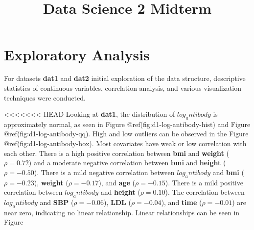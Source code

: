 \documentclass[
]{article}
\title{Data Science 2 Midterm}
\author{}
\date{\vspace{-2.5em}}
\begin{document}
\maketitle

\section{Exploratory Analysis}\label{exploratory-analysis}

For datasets \textbf{dat1} and \textbf{dat2} initial exploration of the
data structure, descriptive statistics of continuous variables,
correlation analysis, and various visualization techniques were
conducted.

\textless\textless\textless\textless\textless\textless\textless{} HEAD
Looking at \textbf{dat1}, the distribution of \textbf{$log_antibody$} is
approximately normal, as seen in Figure @ref(fig:d1-log-antibody-hist)
and Figure @ref(fig:d1-log-antibody-qq). High and low outliers can be
observed in the Figure @ref(fig:d1-log-antibody-box). Most covariates
have weak or low correlation with each other. There is a high positive
correlation between \textbf{bmi} and \textbf{weight} (\(\rho = 0.72\))
and a moderate negative correlation between \textbf{bmi} and
\textbf{height} (\(\rho = -0.50\)). There is a mild negative correlation
between \textbf{$log_antibody$} and \textbf{bmi} (\(\rho = -0.23\)),
\textbf{weight} (\(\rho = -0.17\)), and \textbf{age} (\(\rho = -0.15\)).
There is a mild positive correlation between \textbf{$log_antibody$} and
\textbf{height} (\(\rho = 0.10\)). The correlation between
\textbf{$log_antibody$} and \textbf{SBP} (\(\rho = -0.06\)),
\textbf{LDL} (\(\rho = -0.04\)), and \textbf{time} (\(\rho = -0.01\))
are near zero, indicating no linear relationship. Linear relationships
can be seen in Figure
\end{document}
